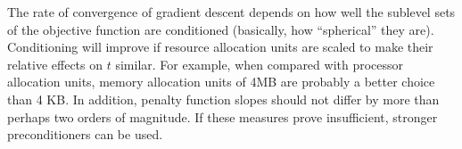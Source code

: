 The rate of convergence of gradient descent depends on how well the sublevel sets of the objective function
are conditioned (basically, how ``spherical'' they are).
Conditioning will improve if resource allocation units are scaled to make their relative effects on $t$ similar.
For example, when compared with processor allocation units,
memory allocation units of 4MB are probably a better choice than 4 KB.
In addition, penalty function slopes should not differ by more than perhaps two orders of magnitude.
If these measures prove insufficient, stronger preconditioners can be used.
